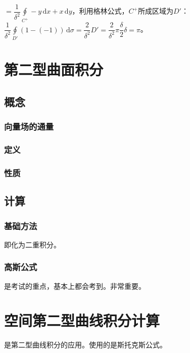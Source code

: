 \documentclass[UTF8, 12pt]{ctexart}
\begin{document}
$=\dfrac{1}{\delta^2}\oint\limits_{C^+}-y\,\textrm{d}x+x\,\textrm{d}y$，利用格林公式，$C^+$所成区域为$D'$：$\dfrac{1}{\delta^2}\oint\limits_{D'}(1-(-1))\,\textrm{d}\sigma=\dfrac{2}{\delta^2}D'=\dfrac{2}{\delta^2}\pi\dfrac{\delta}{2}\delta=\pi$。


\section{第二型曲面积分}

\subsection{概念}

\subsubsection{向量场的通量}

\subsubsection{定义}

\subsubsection{性质}

\subsection{计算}

\subsubsection{基础方法}

即化为二重积分。

\subsubsection{高斯公式}

是考试的重点，基本上都会考到。非常重要。

\section{空间第二型曲线积分计算}

是第二型曲线积分的应用。使用的是斯托克斯公式。
\end{document}
